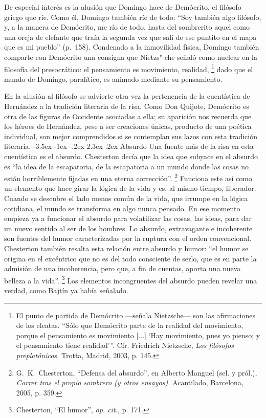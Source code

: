 \documentclass[14pt,twoside,final]{extbook} %
\makeatletter
\let\oldfootnote\footnote
\renewcommand\footnote[1]{%
\oldfootnote{\hspace{1mm}#1}}
\renewcommand\section{\@startsection {section}{1}{\z@}%
                                     {-3.5ex \@plus -1ex \@minus -.2ex}%
                                     {2.3ex \@plus .2ex}%
                                     {\normalfont\large\bfseries\sc}}
\makeatother
\begin{document}
De especial interés es la alusión que Domingo hace de Demócrito, el filósofo griego que ríe. Como él, Domingo también ríe de todo: ``Soy también algo filósofo, y, a la manera de Demócrito, me río de todo, hasta del sombrerito aquel como una oreja de elefante que traía la segunda vez que salí de ese puntito en el mapa que es mi pueblo'' (p.~158). Condenado a la inmovilidad física, Domingo también comparte con Demócrito una consigna que Nietzs"-che señaló como nuclear en la filosofía del presocrático: el pensamiento es movimiento, realidad,\footnote{El punto de partida de Demócrito ---señala Nietzsche--- son las afirmaciones de los eleatas. ``Sólo que Demócrito parte de la realidad del movimiento, porque el pensamiento es movimiento [...] `Hay movimiento, pues yo pienso; y el pensamiento tiene realidad'{}''. Cfr. Friedrich Nietzsche, \emph{Los filósofos preplatónicos.} Trotta, Madrid, 2003, p. 145.} dado que el mundo de Domingo, paralítico, es animado mediante su pensamiento.

En la alusión al filósofo se advierte otra vez la pertenencia de la cuentística de Hernández a la tradición literaria de la risa. Como Don Quijote, Demócrito es otra de las figuras de Occidente asociadas a ella; su aparición nos recuerda que los héroes de Hernández, pese a ser creaciones únicas, producto de una poética individual, son mejor comprendidos si se contemplan sus lazos con esta tradición literaria.
\section{Absurdo}\label{sec:absurdo}
Una fuente más de la risa en esta cuentística es el absurdo. Chesterton decía que la idea que subyace en el absurdo es ``la idea de la escapatoria, de la escapatoria a un mundo donde las cosas no están horriblemente fijadas en una eterna corrección''.\footnote{G.~K.~Chesterton, ``Defensa del absurdo'', en Alberto Manguel (sel. y pról.), \emph{Correr tras el propio sombrero (y otros ensayos).} Acantilado, Barcelona, 2005, p. 359.} Funciona este así como un elemento que hace girar la lógica de la vida y es, al mismo tiempo, liberador. Cuando se descubre el lado menos común de la vida, que irrumpe en la lógica cotidiana, el mundo se transforma en algo nunca pensado. En ese momento empieza ya a funcionar el absurdo para volatilizar las cosas, las ideas, para dar un nuevo sentido al ser de los hombres. Lo absurdo, extravagante e incoherente son fuentes del humor caracterizadas por la ruptura con el orden convencional. Chesterton también resalta esta relación entre absurdo y humor: ``el humor se origina en el excéntrico que no es del todo consciente de serlo, que es en parte la admisión de una incoherencia, pero que, a fin de cuentas, aporta una nueva belleza a la vida''.\footnote{Chesterton, ``El humor'', \emph{op. cit.,} p. 171.} Los elementos incongruentes del absurdo pueden revelar una verdad, como Bajtín ya había señalado.
\end{document}
